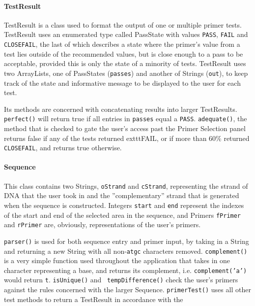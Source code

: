 \paragraph{TestResult}
TestResult is a class used to format the output of one or multiple primer 
tests. TestResult uses an enumerated type called PassState with values
\texttt{PASS}, \texttt{FAIL} and \texttt{CLOSEFAIL}, the last of which describes 
a state where the primer's value from a test lies outside of the recommended
values, but is close enough to a pass to be acceptable, provided this is 
only the state of a minority of tests. TestResult uses two ArrayLists, one of
PassStates (\texttt{passes}) and another of Strings (\texttt{out}), to keep track 
of the state and informative message to be displayed to the user for each 
test. 

Its methods are concerned with concatenating results into larger 
TestResults. \texttt{perfect()} will return true if all entries in 
\texttt{passes} equal a \texttt{PASS}. \texttt{adequate()}, the method that is 
checked to gate the user's access past the Primer Selection panel returns 
false if any of the tests returned 	exttt{FAIL}, or if more than 60\% 
returned \texttt{CLOSEFAIL}, and returns true otherwise.

\paragraph{Sequence}
This class contains two Strings, \texttt{oStrand} and \texttt{cStrand}, 
representing the strand of DNA that the user took in and the ''complementary''
strand that is generated when the sequence is constructed. Integers 
\texttt{start} and \texttt{end} represent the indexes of the start and end of 
the selected area in the sequence, and Primers \texttt{fPrimer} and 
\texttt{rPrimer} are, obviously, representations of the user's primers.
 
\texttt{parser()} is used for both sequence entry and primer input, by taking in
a String and returning a new String with all non-\texttt{atgc} characters removed.
\texttt{complement()} is a very simple function used throughout the application
that takes in one character representing a base, and returns its complement, i.e.
\texttt{complement('a')} would return \texttt{t}. \texttt{isUnique()} and \texttt{
tempDifference()} check the user's primers against the rules concerned with the
larger Sequence. \texttt{primerTest()} uses all other test methods to return a
TestResult in accordance with the  																										%
